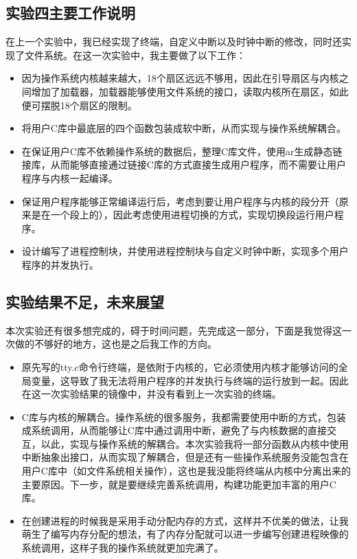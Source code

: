 \documentclass[forprint]{WHUBachelor}
\begin{document}
\subsection{实验四主要工作说明}

在上一个实验中，我已经实现了终端，自定义中断以及时钟中断的修改，同时还实现了文件系统。在这一次实验中，我主要做了以下工作：

\begin{itemize}
  \item 因为操作系统内核越来越大，18个扇区远远不够用，因此在引导扇区与内核之间增加了加载器，加载器能够使用文件系统的接口，读取内核所在扇区，如此便可摆脱18个扇区的限制。
  \item 将用户C库中最底层的四个函数包装成软中断，从而实现与操作系统解耦合。
  \item 在保证用户C库不依赖操作系统的数据后，整理C库文件，使用ar生成静态链接库，从而能够直接通过链接C库的方式直接生成用户程序，而不需要让用户程序与内核一起编译。
  \item 保证用户程序能够正常编译运行后，考虑到要让用户程序与内核的段分开（原来是在一个段上的），因此考虑使用进程切换的方式，实现切换段运行用户程序。
  \item 设计编写了进程控制块，并使用进程控制块与自定义时钟中断，实现多个用户程序的并发执行。
\end{itemize}

\subsection{实验结果不足，未来展望}

本次实验还有很多想完成的，碍于时间问题，先完成这一部分，下面是我觉得这一次做的不够好的地方，这也是之后我工作的方向。

\begin{itemize}
  \item 原先写的tty.c命令行终端，是依附于内核的，它必须使用内核才能够访问的全局变量，这导致了我无法将用户程序的并发执行与终端的运行放到一起。因此在这一次实验结果的镜像中，并没有看到上一次实验的终端。
  \item C库与内核的解耦合。操作系统的很多服务，我都需要使用中断的方式，包装成系统调用，从而能够让C库中通过调用中断，避免了与内核数据的直接交互，以此，实现与操作系统的解耦合。本次实验我将一部分函数从内核中使用中断抽象出接口，从而实现了解耦合，但是还有一些操作系统服务没能包含在用户C库中（如文件系统相关操作），这也是我没能将终端从内核中分离出来的主要原因。下一步，就是要继续完善系统调用，构建功能更加丰富的用户C库。
  \item 在创建进程的时候我是采用手动分配内存的方式，这样并不优美的做法，让我萌生了编写内存分配的想法，有了内存分配就可以进一步编写创建进程映像的系统调用，这样子我的操作系统就更加完满了。
\end{itemize}
\end{document}
